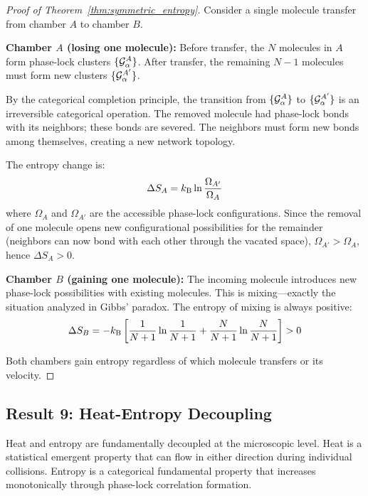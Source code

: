 \begin{proof}[Proof of Theorem~\ref{thm:symmetric_entropy}]
Consider a single molecule transfer from chamber $A$ to chamber $B$.

\textbf{Chamber $A$ (losing one molecule):}
Before transfer, the $N$ molecules in $A$ form phase-lock clusters $\{\mathcal{G}_\alpha^A\}$. After transfer, the remaining $N-1$ molecules must form new clusters $\{\mathcal{G}_\alpha^{A'}\}$.

By the categorical completion principle, the transition from $\{\mathcal{G}_\alpha^A\}$ to $\{\mathcal{G}_\alpha^{A'}\}$ is an irreversible categorical operation. The removed molecule had phase-lock bonds with its neighbors; these bonds are severed. The neighbors must form new bonds among themselves, creating a new network topology.

The entropy change is:
\begin{equation}
\Delta S_A = k_{\mathrm{B}} \ln \frac{\Omega_{A'}}{\Omega_A}
\end{equation}
where $\Omega_A$ and $\Omega_{A'}$ are the accessible phase-lock configurations. Since the removal of one molecule opens new configurational possibilities for the remainder (neighbors can now bond with each other through the vacated space), $\Omega_{A'} > \Omega_A$, hence $\Delta S_A > 0$.

\textbf{Chamber $B$ (gaining one molecule):}
The incoming molecule introduces new phase-lock possibilities with existing molecules. This is mixing---exactly the situation analyzed in Gibbs' paradox. The entropy of mixing is always positive:
\begin{equation}
\Delta S_B = -k_{\mathrm{B}} \left[\frac{1}{N+1}\ln\frac{1}{N+1} + \frac{N}{N+1}\ln\frac{N}{N+1}\right] > 0
\end{equation}

Both chambers gain entropy regardless of which molecule transfers or its velocity.
\end{proof}

\subsection{Result 9: Heat-Entropy Decoupling}

\begin{theorem}
\label{thm:heat_entropy_decoupling}
Heat and entropy are fundamentally decoupled at the microscopic level. Heat is a statistical emergent property that can flow in either direction during individual collisions. Entropy is a categorical fundamental property that increases monotonically through phase-lock correlation formation.
\end{theorem}

